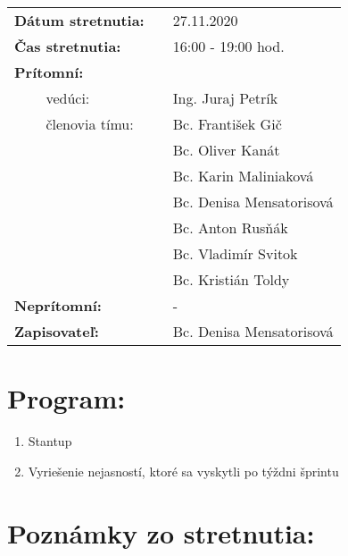 \documentclass{article}
\begin{document}
    

    \begin{table}[h]
        \begin{tabular}{lllll}
            \multicolumn{3}{l}{\textbf{Dátum stretnutia:}} & & 27.11.2020 \\
            \multicolumn{3}{l}{\textbf{Čas stretnutia:}} & & 16:00 - 19:00 hod. \\
            \multicolumn{3}{l}{\textbf{Prítomní:}} \\
            & & vedúci: & & Ing. Juraj Petrík \\
            & & členovia tímu: & & Bc. František Gič  \\
            & & & & Bc. Oliver Kanát \\
            & & & & Bc. Karin Maliniaková \\
            & & & & Bc. Denisa Mensatorisová \\
            & & & & Bc. Anton Rusňák \\
            & & & & Bc. Vladimír Svitok \\
            & & & & Bc. Kristián Toldy \\
            \multicolumn{3}{l}{\textbf{Neprítomní:}} & & -\\
            \multicolumn{3}{l}{\textbf{Zapisovateľ:}} & & Bc. Denisa Mensatorisová \\
        \end{tabular}
        \label{tab:grades}
    \end{table}

    \section*{Program:}
    
    \begin{enumerate}
        \item Stantup
        \item Vyriešenie nejasností, ktoré sa vyskytli po týždni šprintu
    \end{enumerate}

    \section*{Poznámky zo stretnutia:}
\end{document}
